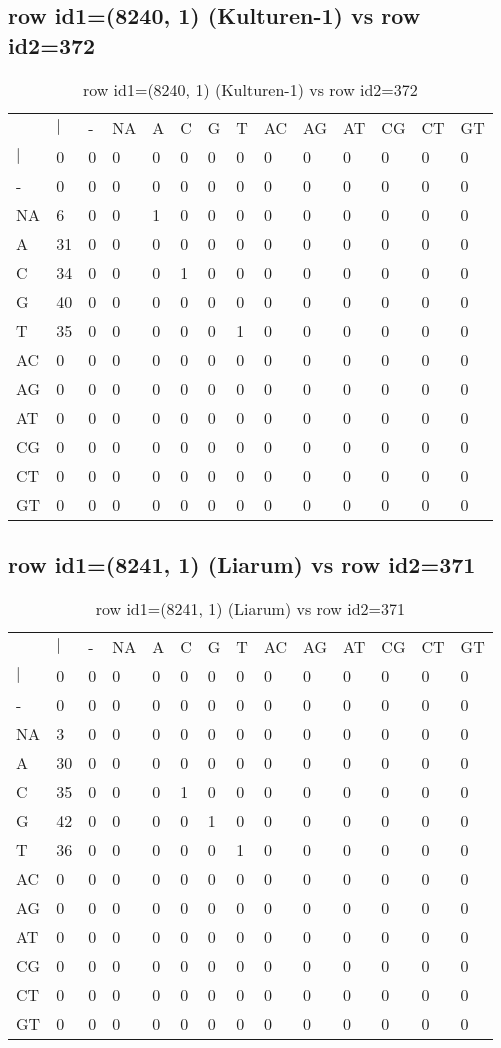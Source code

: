 \subsection{row id1=(8240, 1) (Kulturen-1) vs row id2=372}
\begin{center}
\begin{longtable}{|l|l|l|l|l|l|l|l|l|l|l|l|l|l|}
\caption{row id1=(8240, 1) (Kulturen-1) vs row id2=372} \label{table_dm170}\\
\hline
\\
\hline
&$|$&-&NA&A&C&G&T&AC&AG&AT&CG&CT&GT\\
$|$&0&0&0&0&0&0&0&0&0&0&0&0&0\\
-&0&0&0&0&0&0&0&0&0&0&0&0&0\\
NA&6&0&0&1&0&0&0&0&0&0&0&0&0\\
A&31&0&0&0&0&0&0&0&0&0&0&0&0\\
C&34&0&0&0&1&0&0&0&0&0&0&0&0\\
G&40&0&0&0&0&0&0&0&0&0&0&0&0\\
T&35&0&0&0&0&0&1&0&0&0&0&0&0\\
AC&0&0&0&0&0&0&0&0&0&0&0&0&0\\
AG&0&0&0&0&0&0&0&0&0&0&0&0&0\\
AT&0&0&0&0&0&0&0&0&0&0&0&0&0\\
CG&0&0&0&0&0&0&0&0&0&0&0&0&0\\
CT&0&0&0&0&0&0&0&0&0&0&0&0&0\\
GT&0&0&0&0&0&0&0&0&0&0&0&0&0\\
\hline
\end{longtable}
\end{center}

\subsection{row id1=(8241, 1) (Liarum) vs row id2=371}
\begin{center}
\begin{longtable}{|l|l|l|l|l|l|l|l|l|l|l|l|l|l|}
\caption{row id1=(8241, 1) (Liarum) vs row id2=371} \label{table_dm172}\\
\hline
\\
\hline
&$|$&-&NA&A&C&G&T&AC&AG&AT&CG&CT&GT\\
$|$&0&0&0&0&0&0&0&0&0&0&0&0&0\\
-&0&0&0&0&0&0&0&0&0&0&0&0&0\\
NA&3&0&0&0&0&0&0&0&0&0&0&0&0\\
A&30&0&0&0&0&0&0&0&0&0&0&0&0\\
C&35&0&0&0&1&0&0&0&0&0&0&0&0\\
G&42&0&0&0&0&1&0&0&0&0&0&0&0\\
T&36&0&0&0&0&0&1&0&0&0&0&0&0\\
AC&0&0&0&0&0&0&0&0&0&0&0&0&0\\
AG&0&0&0&0&0&0&0&0&0&0&0&0&0\\
AT&0&0&0&0&0&0&0&0&0&0&0&0&0\\
CG&0&0&0&0&0&0&0&0&0&0&0&0&0\\
CT&0&0&0&0&0&0&0&0&0&0&0&0&0\\
GT&0&0&0&0&0&0&0&0&0&0&0&0&0\\
\hline
\end{longtable}
\end{center}

